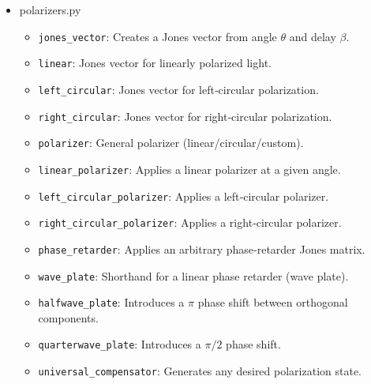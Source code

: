 \documentclass[a4paper,12pt]{report}
\begin{document}
\begin{itemize}[itemsep=1em]
  \item[\large\bfseries 5.\ ] polarizers.py
    \begin{itemize}[itemsep=0.5em]
      \item \texttt{jones\_vector}: Creates a Jones vector from angle \(\theta\) and delay \(\beta\).
      \item \texttt{linear}: Jones vector for linearly polarized light.
      \item \texttt{left\_circular}: Jones vector for left‐circular polarization.
      \item \texttt{right\_circular}: Jones vector for right‐circular polarization.
      \item \texttt{polarizer}: General polarizer (linear/circular/custom).
      \item \texttt{linear\_polarizer}: Applies a linear polarizer at a given angle.
      \item \texttt{left\_circular\_polarizer}: Applies a left‐circular polarizer.
      \item \texttt{right\_circular\_polarizer}: Applies a right‐circular polarizer.
      \item \texttt{phase\_retarder}: Applies an arbitrary phase‐retarder Jones matrix.
      \item \texttt{wave\_plate}: Shorthand for a linear phase retarder (wave plate).
      \item \texttt{halfwave\_plate}: Introduces a \(\pi\) phase shift between orthogonal components.
      \item \texttt{quarterwave\_plate}: Introduces a \(\pi/2\) phase shift.
      \item \texttt{universal\_compensator}: Generates any desired polarization state.
    \end{itemize}


\end{itemize}
\end{document}
